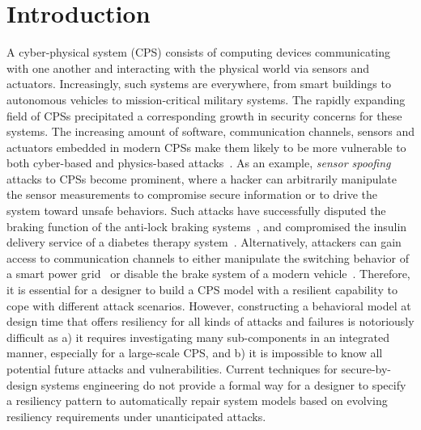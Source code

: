 \section{Introduction}
\label{sec:intro}
%
%
%
A cyber-physical system (CPS) consists of computing devices communicating with one another and interacting with the physical world via sensors and actuators. Increasingly, such systems are everywhere, from smart buildings to autonomous vehicles to mission-critical military systems. 
%
The rapidly expanding field of CPSs precipitated a corresponding growth in security concerns for these systems. The increasing amount of software, communication channels, sensors and actuators embedded in modern CPSs make them likely to be more vulnerable to both cyber-based and physics-based  attacks~\cite{wan2015security, wasicek2014aspect, kocher2004security, al2015design, gamage2010enforcing}. As an example, \emph{sensor spoofing} attacks to CPSs become prominent, where a hacker can arbitrarily manipulate the sensor measurements to compromise secure information or to drive the system toward unsafe behaviors. Such attacks have successfully disputed the braking function of the anti-lock braking systems~\cite{Shoukry2013,al2015design}, and compromised the insulin delivery service of a diabetes therapy system~\cite{li2011hijacking}. Alternatively, attackers can gain access to communication channels to either manipulate the switching behavior of a smart power grid~\cite{liu2011class} or disable the brake system of a modern vehicle~\cite{koscher2010experimental}. 
%
Therefore, it is essential for a designer to build a CPS model with a resilient capability to cope with different attack scenarios. However, constructing a behavioral model at design time that offers resiliency for all kinds of attacks and failures is notoriously difficult as a) it requires investigating many sub-components in an integrated manner, especially for a large-scale CPS, and b) it is impossible to know all potential future attacks and vulnerabilities.
%
Current techniques for secure-by-design systems engineering do not provide a formal way for a designer to specify a resiliency pattern to automatically repair system models based on evolving resiliency requirements under unanticipated attacks. %

